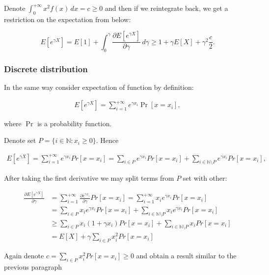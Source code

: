 \documentclass[12pt, a4paper]{article}
\theoremstyle{remark}
\newcommand{\der}[2]{\frac{\partial #1}{\partial #2}}
\begin{document}
Denote $\int_{0}^{+\infty} x^2 f(x) \, dx = c \geq 0$ and then if we reintegrate back, we get a restriction on the expectation from below:

\[
E[e^{\gamma X}] = E[1] + \int_0^\gamma \frac{\partial E[e^{\gamma X}]}{\partial \gamma} \, d\gamma \geq 1 + \gamma E[X] + \gamma^2 \frac{c}{2}.    
\]

\subsubsection*{Discrete distribution}

In the same way consider expectation of function by definition:

\begin{align*}
    E[e^{\gamma X}] = \sum_{i = 1}^{+\infty} e^{\gamma x_i} \Pr[x = x_i],
\end{align*}

where $\Pr$ is a probability function.


Denote set $P = \{i \in \mathbb{N}: x_i \geq 0\}$. Hence 

\begin{align*}
    E[e^{\gamma X}] = \sum_{i = 1}^{+\infty} e^{\gamma x_i} Pr[x = x_i] = \sum_{i \in P} e^{\gamma x_i} Pr[x = x_i] + \sum_{i \in \mathbb{N}\setminus P} e^{\gamma x_i} Pr[x = x_i],
\end{align*}

After taking the first derivative we may split terms from $P$ set with other: 

\begin{align*}
    \der{E[e^{\gamma X}]}{\gamma} &= \sum_{i = 1}^{+\infty} \frac{\partial e^{\gamma x_i}}{\partial \gamma} Pr[x = x_i] = \sum_{i = 1}^{+\infty} x_i e^{\gamma x_i} Pr[x = x_i] \\
    &= \sum_{i \in P} x_i e^{\gamma x_i} Pr[x = x_i] + \sum_{i \in \mathbb{N}\setminus P} x_i e^{\gamma x_i} Pr[x = x_i] \\
    &\geq \sum_{i \in P} x_i (1 + {\gamma x_i}) Pr[x = x_i] + \sum_{i \in \mathbb{N}\setminus P} x_i Pr[x = x_i] \\
    &= E[X] + \gamma\sum_{i \in P} x_i^2 Pr[x = x_i]
\end{align*}

Again denote $c = \sum_{i \in P} x_i^2 Pr[x = x_i] \geq 0$ and obtain a result similar to the previous paragraph 
\end{document}
